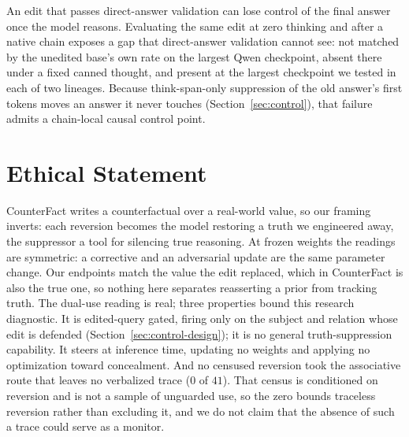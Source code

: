 \documentclass[letterpaper]{article} %
\begin{document}
An edit that passes direct-answer validation can lose control of the final answer once the model reasons.  Evaluating the same edit at zero thinking and after a native chain exposes a gap that direct-answer validation cannot see: not matched by the unedited base's own rate on the largest Qwen checkpoint, absent there under a fixed canned thought, and present at the largest checkpoint we tested in each of two lineages.  Because think-span-only suppression of the old answer's first tokens moves an answer it never touches (Section~\ref{sec:control}), that failure admits a chain-local causal control point.

\section*{Ethical Statement}

CounterFact writes a counterfactual over a real-world value, so our framing inverts: each reversion becomes the model restoring a truth we engineered away, the suppressor a tool for silencing true reasoning.  At frozen weights the readings are symmetric: a corrective and an adversarial update are the same parameter change.  Our endpoints match the value the edit replaced, which in CounterFact is also the true one, so nothing here separates reasserting a prior from tracking truth.  The dual-use reading is real; three properties bound this research diagnostic.  It is edited-query gated, firing only on the subject and relation whose edit is defended (Section~\ref{sec:control-design}); it is no general truth-suppression capability.  It steers at inference time, updating no weights and applying no optimization toward concealment.  And no censused reversion took the associative route that leaves no verbalized trace (\(0\) of \(41\)).  That census is conditioned on reversion and is not a sample of unguarded use, so the zero bounds traceless reversion rather than excluding it, and we do not claim that the absence of such a trace could serve as a monitor. %


\end{document}
